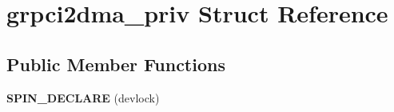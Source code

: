 \hypertarget{structgrpci2dma__priv}{}\section{grpci2dma\+\_\+priv Struct Reference}
\label{structgrpci2dma__priv}
\subsection*{Public Member Functions}
\begin{DoxyCompactItemize}
\item 
\mbox{\label{structgrpci2dma__priv_a1eba0fa075b393cc2697e24a123251a5}} 
{\bfseries S\+P\+I\+N\+\_\+\+D\+E\+C\+L\+A\+RE} (devlock)
\end{DoxyCompactItemize}
